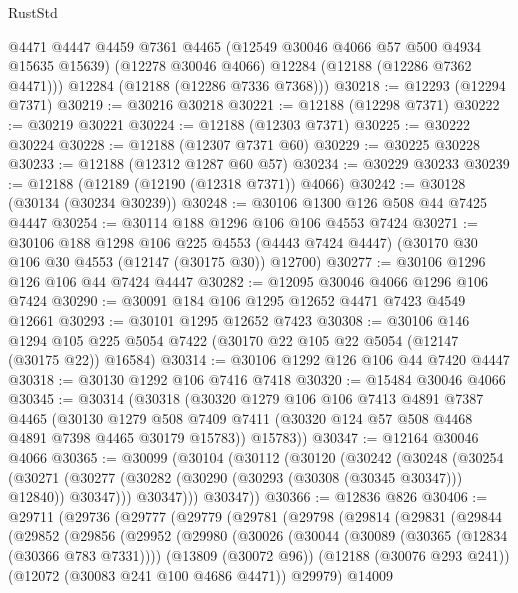 \begin{lexlean}{RustStd}
\begin{coremodule}
        @4471
        @4447
        @4459
        @7361
        @4465
        (@12549 @30046 @4066 @57 @500 @4934 @15635 @15639)
        (@12278 @30046 @4066)
        @12284
        (@12188 (@12286 @7362 @4471)))
      @12284
      (@12188 (@12286 @7336 @7368)))
@30218 := @12293 (@12294 @7371)
@30219 := @30216 @30218
@30221 := @12188 (@12298 @7371)
@30222 := @30219 @30221
@30224 := @12188 (@12303 @7371)
@30225 := @30222 @30224
@30228 := @12188 (@12307 @7371 @60)
@30229 := @30225 @30228
@30233 := @12188 (@12312 @1287 @60 @57)
@30234 := @30229 @30233
@30239 := @12188 (@12189 (@12190 (@12318 @7371)) @4066)
@30242 := @30128 (@30134 (@30234 @30239))
@30248 := @30106 @1300 @126 @508 @44 @7425 @4447
@30254 := @30114 @188 @1296 @106 @106 @4553 @7424
@30271 := @30106
    @188
    @1298
    @106
    @225
    @4553
    (@4443 @7424 @4447)
    (@30170 @30 @106 @30 @4553 (@12147 (@30175 @30)) @12700)
@30277 := @30106 @1296 @126 @106 @44 @7424 @4447
@30282 := @12095 @30046 @4066 @1296 @106 @7424
@30290 := @30091 @184 @106 @1295 @12652 @4471 @7423 @4549 @12661
@30293 := @30101 @1295 @12652 @7423
@30308 := @30106
    @146
    @1294
    @105
    @225
    @5054
    @7422
    (@30170 @22 @105 @22 @5054 (@12147 (@30175 @22)) @16584)
@30314 := @30106 @1292 @126 @106 @44 @7420 @4447
@30318 := @30130 @1292 @106 @7416 @7418
@30320 := @15484 @30046 @4066
@30345 := @30314
    (@30318
      (@30320
        @1279
        @106
        @106
        @7413
        @4891
        @7387
        @4465
        (@30130 @1279 @508 @7409 @7411 (@30320 @124 @57 @508 @4468 @4891 @7398 @4465 @30179 @15783))
        @15783))
@30347 := @12164 @30046 @4066
@30365 := @30099
    (@30104
      (@30112
        (@30120
          (@30242
            (@30248
              (@30254
                (@30271 (@30277 (@30282 (@30290 (@30293 (@30308 (@30345 @30347))) @12840)) @30347)))
              @30347)))
        @30347))
@30366 := @12836 @826
@30406 := @29711
    (@29736
      (@29777
        (@29779
          (@29781
            (@29798
              (@29814
                (@29831
                  (@29844
                    (@29852
                      (@29856
                        (@29952
                          (@29980
                            (@30026
                              (@30044
                                (@30089 (@30365 (@12834 (@30366 @783 @7331))))
                                (@13809 (@30072 @96))
                                (@12188 (@30076 @293 @241))
                                (@12072 (@30083 @241 @100 @4686 @4471))
                                @29979)
                              @14009

\end{coremodule}
\end{lexlean}
